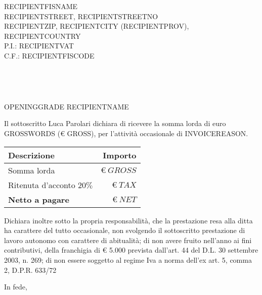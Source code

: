 \documentclass[12pt, a4paper]{letter} %
\renewcommand{\opening}[1]{
	{\centering\fromaddress\vspace{0.05\textheight} \\ %
	}%
	{\raggedright \toname \\ \toaddress \par} %
	\vspace{1cm} %
	\noindent #1 %
}
\renewcommand{\closing}[1]{
	\vspace{2.5mm} %
	\noindent %
	\hspace*{\longindentation} %
	\parbox{\indentedwidth}{
		\raggedright
		#1 %
		\vskip 1.65cm %
		\fromsig %
	}
}
\begin{document}

\begin{letter}{
	RECIPIENTFISNAME\\ %
	RECIPIENTSTREET, RECIPIENTSTREETNO\\ %
	RECIPIENTZIP, RECIPIENTCITY (RECIPIENTPROV), RECIPIENTCOUNTRY\\ %
	P.I.: RECIPIENTVAT\\ %
	C.F.: RECIPIENTFISCODE %
}


\opening{OPENINGGRADE RECIPIENTNAME}  %

Il sottoscritto Luca Parolari dichiara di ricevere la somma lorda di euro
GROSSWORDS (€ GROSS), per l’attività occasionale di INVOICEREASON.

\begin{center}
\begin{tabularx}{300pt}{|X|r|}
  	\textbf{Descrizione} & \textbf{Importo}\\
	\hline
	Somma lorda & $\euro\ GROSS$\\
	Ritenuta d'acconto $20\%$ & $\euro\ TAX$\\
	\textbf{Netto a pagare} & $\euro\ NET$\\
\end{tabularx}
\end{center}

Dichiara inoltre sotto la propria responsabilità, che la prestazione resa alla
ditta ha carattere del tutto occasionale, non svolgendo il sottoscritto
prestazione di lavoro autonomo con carattere di abitualità; di non avere fruito
nell’anno ai fini contributivi, della franchigia di \euro{} 5.000 prevista dall’art. 44
del D.L. 30 settembre 2003, n. 269; di non essere soggetto al regime Iva a
norma dell’ex art. 5, comma 2, D.P.R. 633/72

\closing{In fede,}




\end{letter}
\end{document}
